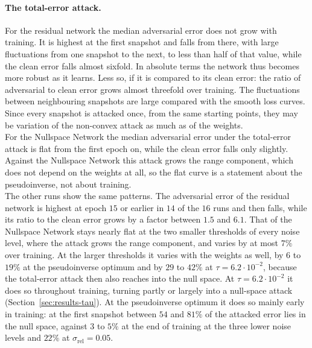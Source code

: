 \documentclass{article}
\numberwithin{equation}{section}
\begin{document}
\paragraph{The total-error attack.} For the residual network the median adversarial error does not grow
with training. It is highest at the first snapshot and falls from there, with large fluctuations from one
snapshot to the next, to less than half of that value, while the clean error falls almost sixfold. In
absolute terms the network thus becomes more robust as it learns. Less so, if it is compared to its clean
error: the ratio of adversarial to clean error grows almost threefold over training. The fluctuations between
neighbouring snapshots are large compared with the smooth loss curves. Since every snapshot is attacked once,
from the same starting points, they may be variation of the non-convex attack as much as of the weights.\\
For the Nullspace Network the median adversarial error under the total-error attack is flat from the
first epoch on, while the clean error falls only slightly. Against the Nullspace Network this attack
grows the range component, which does not depend on the weights at all, so the flat curve is a
statement about the pseudoinverse, not about training.\\
The other runs show the same patterns. The adversarial error of the residual network is highest at
epoch $15$ or earlier in $14$ of the $16$ runs and then falls, while its ratio to the clean error grows by a
factor between $1.5$ and $6.1$. That of the Nullspace Network stays nearly flat at the two smaller thresholds
of every noise level, where the attack grows the range component, and varies by at most $7\%$ over training. At the
larger thresholds it varies with the weights as well, by $6$ to $19\%$ at the pseudoinverse optimum and by
$29$ to $42\%$ at $\tau=6.2\cdot10^{-2}$, because the total-error attack then also reaches into the null
space. At $\tau=6.2\cdot10^{-2}$ it does so throughout training, turning partly or largely into a
null-space attack (Section~\ref{sec:results-tau}). At the pseudoinverse optimum it does so mainly early in
training: at the first snapshot between $54$ and $81\%$ of the attacked error lies in the null space,
against $3$ to $5\%$ at the end of training at the three lower noise levels and $22\%$ at
$\sigma_\text{rel}=0.05$.
\end{document}
